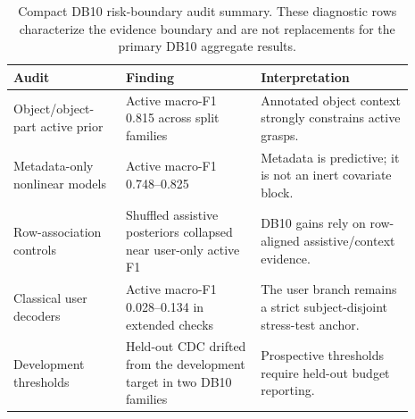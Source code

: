 \begin{table}[!t]
\centering
\caption{Compact DB10 risk-boundary audit summary. These diagnostic rows characterize the evidence boundary and are not replacements for the primary DB10 aggregate results.}
\label{tab:db10-risk-boundary-summary}
\scriptsize
\setlength{\tabcolsep}{3pt}
\begin{tabular}{p{0.25\linewidth}p{0.30\linewidth}p{0.34\linewidth}}
\toprule
Audit & Finding & Interpretation \\
\midrule
Object/object-part active prior & Active macro-F1 0.815 across split families & Annotated object context strongly constrains active grasps. \\
Metadata-only nonlinear models & Active macro-F1 0.748--0.825 & Metadata is predictive; it is not an inert covariate block. \\
Row-association controls & Shuffled assistive posteriors collapsed near user-only active F1 & DB10 gains rely on row-aligned assistive/context evidence. \\
Classical user decoders & Active macro-F1 0.028--0.134 in extended checks & The user branch remains a strict subject-disjoint stress-test anchor. \\
Development thresholds & Held-out CDC drifted from the development target in two DB10 families & Prospective thresholds require held-out budget reporting. \\
\bottomrule
\end{tabular}
\end{table}
